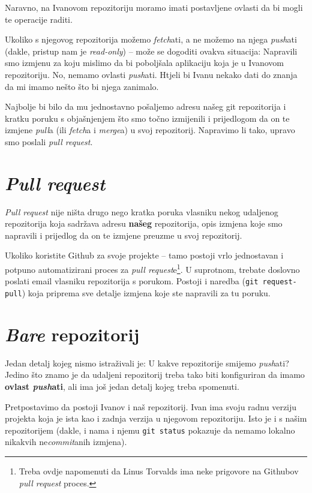 
Naravno, na Ivanovom repozitoriju moramo imati postavljene ovlasti da bi mogli te operacije raditi.

Ukoliko s njegovog repozitorija možemo \emph{fetch}ati, a ne možemo na njega \emph{push}ati (dakle, pristup nam je \emph{read-only}) -- može se dogoditi ovakva situacija:
Napravili smo izmjenu za koju mislimo da bi poboljšala aplikaciju koja je u Ivanovom repozitoriju.
No, nemamo ovlasti \emph{push}ati.
Htjeli bi Ivanu nekako dati do znanja da mi imamo nešto što bi njega zanimalo.

Najbolje bi bilo da mu jednostavno pošaljemo adresu našeg git repozitorija i kratku poruku s objašnjenjem što smo točno izmijenili i prijedlogom da on te izmjene \emph{pull}a (ili \emph{fetch}a i \emph{merge}a) u svoj repozitorij.
Napravimo li tako, upravo smo poslali \emph{pull request}.

\section*{\emph{Pull request}}

\emph{Pull request} nije ništa drugo nego kratka poruka vlasniku nekog udaljenog repozitorija koja sadržava adresu \textbf{našeg} repozitorija, opis izmjena koje smo napravili i prijedlog da on te izmjene preuzme u svoj repozitorij.

Ukoliko koristite Github za svoje projekte -- tamo postoji vrlo jednostavan i potpuno automatizirani proces za \emph{pull request}e\footnote{Treba ovdje napomenuti da Linus Torvalds ima neke prigovore na Githubov \emph{pull request} proces.}.
U suprotnom, trebate doslovno poslati email vlasniku repozitorija s porukom.
Postoji i naredba (\verb+git request-pull+) koja priprema sve detalje izmjena koje ste napravili za tu poruku.

\section*{\emph{Bare} repozitorij}

Jedan detalj kojeg nismo istraživali je: U kakve repozitorije smijemo \emph{push}ati? 
Jedino što znamo je da udaljeni repozitorij treba tako biti konfiguriran da imamo \textbf{ovlast \emph{push}ati}, ali ima još jedan detalj kojeg treba spomenuti.

Pretpostavimo da postoji Ivanov i naš repozitorij.
Ivan ima svoju radnu verziju projekta koja je ista kao i zadnja verzija u njegovom repozitoriju.
Isto je i s našim repozitorijem (dakle, i nama i njemu \verb+git status+ pokazuje da nemamo lokalno nikakvih ne\emph{commit}anih izmjena).


